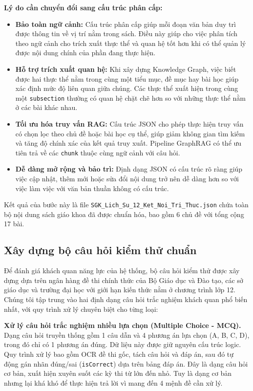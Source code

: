 \begin{enumerate}
    \textbf{Lý do cần chuyển đổi sang cấu trúc phân cấp:}
    \begin{itemize}
        \item \textbf{Bảo toàn ngữ cảnh:} Cấu trúc phân cấp giúp mỗi đoạn văn bản duy trì được thông tin về vị trí nằm trong sách. Điều này giúp cho việc phân tích theo ngữ cảnh cho trích xuất thực thể và quan hệ tốt hơn khi có thể quản lý được nội dung chính của phần đang thực hiện.
        \item \textbf{Hỗ trợ trích xuất quan hệ:} Khi xây dựng Knowledge Graph, việc biết được hai thực thể nằm trong cùng một tiểu mục, đề mục hay bài học giúp xác định mức độ liên quan giữa chúng. Các thực thể xuất hiện trong cùng một \texttt{subsection} thường có quan hệ chặt chẽ hơn so với những thực thể nằm ở các bài khác nhau.
        \item \textbf{Tối ưu hóa truy vấn RAG:} Cấu trúc JSON cho phép thực hiện truy vấn có chọn lọc theo chủ đề hoặc bài học cụ thể, giúp giảm không gian tìm kiếm và tăng độ chính xác của kết quả truy xuất. Pipeline GraphRAG có thể ưu tiên trả về các \texttt{chunk} thuộc cùng ngữ cảnh với câu hỏi.
        \item \textbf{Dễ dàng mở rộng và bảo trì:} Định dạng JSON có cấu trúc rõ ràng giúp việc cập nhật, thêm mới hoặc sửa đổi nội dung trở nên dễ dàng hơn so với việc làm việc với văn bản thuần không có cấu trúc.
    \end{itemize}
    
    Kết quả của bước này là file \texttt{SGK\_Lich\_Su\_12\_Ket\_Noi\_Tri\_Thuc.json} chứa toàn bộ nội dung sách giáo khoa đã được chuẩn hóa, bao gồm 6 chủ đề với tổng cộng 17 bài.
\end{enumerate}

\subsection{Xây dựng bộ câu hỏi kiểm thử chuẩn}
Để đánh giá khách quan năng lực của hệ thống, bộ câu hỏi kiểm thử được xây dựng dựa trên ngân hàng đề thi chính thức của Bộ Giáo dục và Đào tạo, các sở giáo dục và trường đại học với giới hạn kiến thức nằm ở chương trình lớp 12. Chúng tôi tập trung vào hai định dạng câu hỏi trắc nghiệm khách quan phổ biến nhất, với quy trình xử lý chuyên biệt cho từng loại:

\textbf{Xử lý câu hỏi trắc nghiệm nhiều lựa chọn (Multiple Choice - MCQ).}
Dạng câu hỏi truyền thống gồm 1 câu dẫn và 4 phương án lựa chọn (A, B, C, D), trong đó chỉ có 1 phương án đúng. Dữ liệu này được giữ nguyên cấu trúc logic. Quy trình xử lý bao gồm OCR đề thi gốc, tách câu hỏi và đáp án, sau đó tự động gán nhãn đúng/sai (\texttt{isCorrect}) dựa trên bảng đáp án. Đây là dạng câu hỏi cơ bản, xuất hiện xuyên suốt các kỳ thi từ lớn đến nhỏ. Tuy là dạng cơ bản nhưng lại khá khó để thực hiện trả lời vì mang đến 4 mệnh đề cần xử lý.

